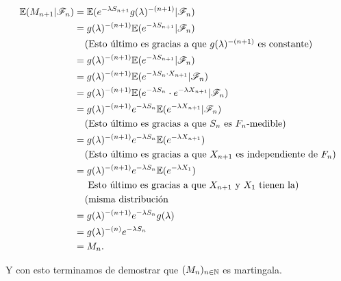 \begin{itemize}
            \begin{align}
                \mathbb{E}(M_{n+1} | \mathscr{F}_n)      &=      \mathbb{E}(e^{-\lambda S_{n+1}}g(\lambda)^{-(n+1)}|\mathscr{F}_n)                                        \\
                                        &=      g(\lambda)^{-(n+1)}\mathbb{E}(e^{-\lambda S_{n+1}}|\mathscr{F}_n)                                        \\
                                        &\;\;\;\;\mbox{(Esto último es gracias a que $g(\lambda)^{-(n+1)}$ es constante)}               		\\
                                        &=      g(\lambda)^{-(n+1)}\mathbb{E}(e^{-\lambda S_{n+1}}|\mathscr{F}_n)                                        \\
                                        &=      g(\lambda)^{-(n+1)}\mathbb{E}(e^{-\lambda S_{n} \cdot X_{n+1}}|\mathscr{F}_n)                            \\
                                        &=      g(\lambda)^{-(n+1)}\mathbb{E}(e^{-\lambda S_{n}} \cdot e^{-\lambda X_{n+1}}|\mathscr{F}_n)               \\
                                        &=      g(\lambda)^{-(n+1)} e^{-\lambda S_{n}} \mathbb{E}(e^{-\lambda X_{n+1}}|\mathscr{F}_n)                    \\                                       
                                        &\;\;\;\;\mbox{(Esto último es gracias a que $S_n$ es $F_n$-medible)}                           		\\
                                        &=      g(\lambda)^{-(n+1)} e^{-\lambda S_{n}} \mathbb{E}(e^{-\lambda X_{n+1}})                         \\
                                        &\;\;\;\;\mbox{(Esto último es gracias a que $X_{n+1}$ es independiente de $F_n$)}              		\\
                                        &=      g(\lambda)^{-(n+1)} e^{-\lambda S_{n}} \mathbb{E}(e^{-\lambda X_{1}})                           \\
                                        &\;\;\;\;\mbox{ Esto último es gracias a que $X_{n+1}$ y $X_1$ tienen la)}                       	    \\ 
                                        &\;\;\;\;\mbox{(misma distribución}   															\\
                                        &=      g(\lambda)^{-(n+1)} e^{-\lambda S_{n}} g(\lambda)                                       \\
                                        &=      g(\lambda)^{-(n)} e^{-\lambda S_{n}}                                                    \\
                                        &=      M_n.
            \end{align}\par\null
    \end{itemize}
    
    Y con esto terminamos de demostrar que $(M_n)_{n \in \mathbb{N}}$ es martingala.
